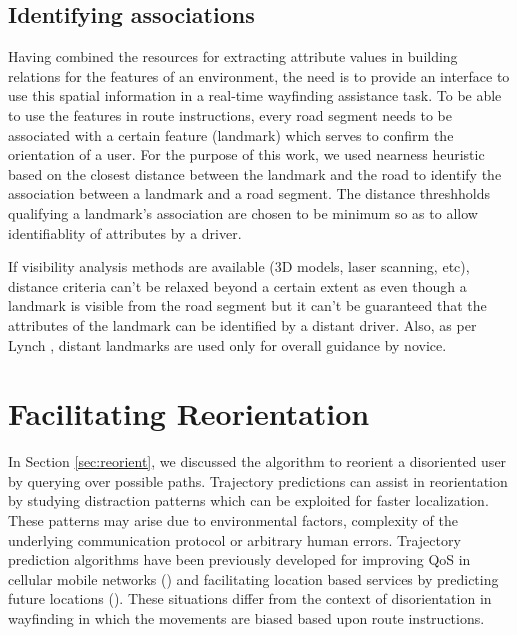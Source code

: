 \documentclass{iitkthesis}
\begin{document}
\subsection{Identifying associations}
Having combined the resources for extracting attribute values in building relations for the features of an environment, the need is to provide an interface to use this spatial information in a real-time wayfinding assistance task. To be able to use the features in route instructions, every road segment needs to be associated with a certain feature (landmark) which serves to confirm the orientation of a user. For the purpose of this work, we used nearness heuristic based on the closest distance between the landmark and the road to identify the association between a landmark and a road segment. The distance threshholds qualifying a landmark's association are chosen to be minimum so as to allow identifiablity of attributes by a driver. 

If visibility analysis methods are available (3D models, laser scanning, etc), distance criteria can't be relaxed beyond a certain extent as even though a landmark is visible from the road segment but it can't be guaranteed that the attributes of the landmark can be identified by a distant driver. Also, as per Lynch \cite{lynch}, distant landmarks are used only for overall guidance by novice.

\section{Facilitating Reorientation}
In Section \ref{sec:reorient}, we discussed the algorithm to reorient a disoriented user by querying over possible paths. Trajectory predictions can assist in reorientation by studying distraction patterns which can be exploited for faster localization. These patterns may arise due to environmental factors, complexity of the underlying communication protocol or arbitrary human errors. Trajectory prediction algorithms have been previously developed for improving QoS in cellular mobile networks (\cite{kyri}) and facilitating location based services by predicting future locations (\cite{karimi}). These situations differ from the context of disorientation in wayfinding in which the movements are biased based upon route instructions. 
\end{document}
